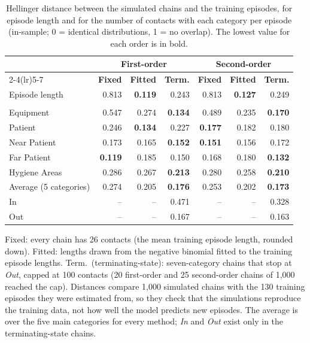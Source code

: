 \begin{table}[htbp]
\centering
\small
\caption{Hellinger distance between the simulated chains and the training episodes, for episode length and for the number of contacts with each category per episode (in-sample; 0 = identical distributions, 1 = no overlap). The lowest value for each order is in bold.}
\label{tab:hellinger}
\setlength{\tabcolsep}{4pt}
\begin{tabular*}{\linewidth}{@{\extracolsep{\fill}}lrrrrrr}
\toprule
 & \multicolumn{3}{c}{\textbf{First-order}} & \multicolumn{3}{c}{\textbf{Second-order}} \\
\cmidrule(lr){2-4}\cmidrule(lr){5-7}
 & \textbf{Fixed} & \textbf{Fitted} & \textbf{Term.} & \textbf{Fixed} & \textbf{Fitted} & \textbf{Term.} \\
\midrule
Episode length & 0.813 & \textbf{0.119} & 0.243 & 0.813 & \textbf{0.127} & 0.249 \\
\addlinespace
\multicolumn{7}{l}{\textit{Contacts per episode}} \\
Equipment & 0.547 & 0.274 & \textbf{0.134} & 0.489 & 0.235 & \textbf{0.170} \\
Patient & 0.246 & \textbf{0.134} & 0.227 & \textbf{0.177} & 0.182 & 0.180 \\
Near Patient & 0.173 & 0.165 & \textbf{0.152} & \textbf{0.151} & 0.156 & 0.172 \\
Far Patient & \textbf{0.119} & 0.185 & 0.150 & 0.168 & 0.180 & \textbf{0.132} \\
Hygiene Areas & 0.286 & 0.267 & \textbf{0.213} & 0.280 & 0.258 & \textbf{0.210} \\
\addlinespace
Average (5 categories) & 0.274 & 0.205 & \textbf{0.176} & 0.253 & 0.202 & \textbf{0.173} \\
\addlinespace
In & -- & -- & 0.471 & -- & -- & 0.328 \\
Out & -- & -- & 0.167 & -- & -- & 0.163 \\
\bottomrule
\end{tabular*}
\par\smallskip
\begin{minipage}{\linewidth}\footnotesize
Fixed: every chain has 26 contacts (the mean training episode length, rounded down). Fitted: lengths drawn from the negative binomial fitted to the training episode lengths. Term.\ (terminating-state): seven-category chains that stop at \textit{Out}, capped at 100 contacts (20 first-order and 25 second-order chains of 1,000 reached the cap). Distances compare 1,000 simulated chains with the 130 training episodes they were estimated from, so they check that the simulations reproduce the training data, not how well the model predicts new episodes. The average is over the five main categories for every method; \textit{In} and \textit{Out} exist only in the terminating-state chains.
\end{minipage}
\end{table}
